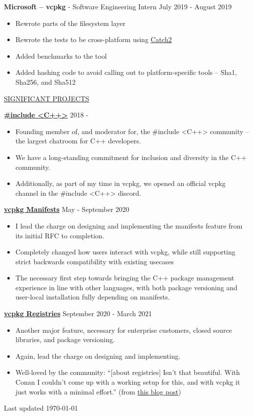 \documentclass[11pt]{article}
\newcommand{\betteruline}[1]{
  \uline{#1}
}
\newcommand{\sectiontitle}[1]{
  \begingroup
    \titlebold
    \betteruline{\Large\uppercase{#1}  }
    \vspace{1.7mm}
  \endgroup
}
\newcommand{\sectioncontent}[1]{
  \begingroup
    \begin{FlushLeft}
    \vspace{-3mm}
    \sffamily\small#1
    \end{FlushLeft}
  \endgroup
  \vspace{2mm}
}
\newcommand{\job}[3]{
  \begingroup
    \textbf{\small#1} - \small#2
    \hfill\color{black!70}\small{#3}
  \endgroup
}
\newcommand{\project}[2]{
  \begingroup
    \textbf{\small#1}
    \hfill\color{black!70}\small{#2}
  \endgroup
}
\newcommand{\spacevv}{
  \vspace{2mm}
}
\begin{document}
\begin{paracol}{2}
{\job{Microsoft -- vcpkg}{Software Engineering Intern}{July 2019 - August 2019}
\begin{itemize}
  \item Rewrote parts of the filesystem layer
  \item Rewrote the tests to be cross-platform using \href{https://github.com/catchorg/Catch2}{Catch2}
  \item Added benchmarks to the tool
  \item Added hashing code to avoid calling out to platform-specific tools -- Sha1, Sha256, and Sha512
\end{itemize}

}

\sectiontitle{significant projects}
\sectioncontent{

\project{\href{https://includecpp.org}{\#include <C++>}}{2018 -}
\begin{itemize}
  \item Founding member of, and moderator for, the \#include <C++> community -- the largest chatroom for C++ developers.
  \item We have a long-standing commitment for inclusion and diversity in the C++ community.
  \item Additionally, as part of my time in vcpkg, we opened an official vcpkg channel in the \#include <C++> discord.
\end{itemize}
\spacevv

\project{\href{https://learn.microsoft.com/en-us/vcpkg/users/manifests}{vcpkg Manifests}}{May - September 2020}
\begin{itemize}
  \item I lead the charge on designing and implementing the manifests feature from its initial RFC to completion.
  \item Completely changed how users interact with vcpkg,
  while still supporting strict backwards compatibility with existing usecases
  \item The necessary first step towards bringing the C++ package management experience in line with other languages,
  with both package versioning and user-local installation fully depending on manifests.
\end{itemize}
\spacevv
    
\project{\href{https://learn.microsoft.com/en-us/vcpkg/users/registries}{vcpkg Registries}}{September 2020 - March 2021}
\begin{itemize}
  \item Another major feature, necessary for enterprise customers, closed source libraries, and package versioning.
  \item Again, lead the charge on designing and implementing.
  \item Well-loved by the community:
  ``[about registries] Isn't that beautiful. With Conan I couldn't come up with a working setup for this,
  and with vcpkg it just works with a minimal effort.'' (from \href{https://decovar.dev/blog/2022/10/30/cpp-dependencies-with-vcpkg/}{this blog post})
\end{itemize}
\spacevv
}

\normaltext \hfill \tiny Last updated \today

\end{paracol}
\end{document}
